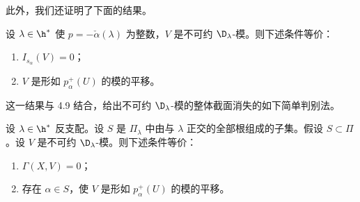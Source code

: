 此外，我们还证明了下面的结果。

\begin{proposition}\label{prop:03.8.6}
设 $\lambda\in\h^*$ 使 $p=-\check\alpha(\lambda)$ 为整数，$V$ 是不可约 $\D_\lambda$-模。则下述条件等价：
\begin{enumerate}[label=(\roman*),leftmargin=2.6em,itemsep=0.1em]
\item $I_{s_\alpha}(V)=0$；
\item $V$ 是形如 $p_\alpha^+(U)$ 的模的平移。
\end{enumerate}
\end{proposition}

这一结果与 4.9 结合，给出不可约 $\D_\lambda$-模的整体截面消失的如下简单判别法。

\begin{theorem}\label{thm:03.8.7}
设 $\lambda\in\h^*$ 反支配。设 $S$ 是 $\Pi_\lambda$ 中由与 $\lambda$ 正交的全部根组成的子集。假设 $S\subset\Pi$。设 $V$ 是不可约 $\D_\lambda$-模。则下述条件等价：
\begin{enumerate}[label=(\roman*),leftmargin=2.6em,itemsep=0.1em]
\item $\Gamma(X,V)=0$；
\item 存在 $\alpha\in S$，使 $V$ 是形如 $p_\alpha^+(U)$ 的模的平移。
\end{enumerate}
\end{theorem}
